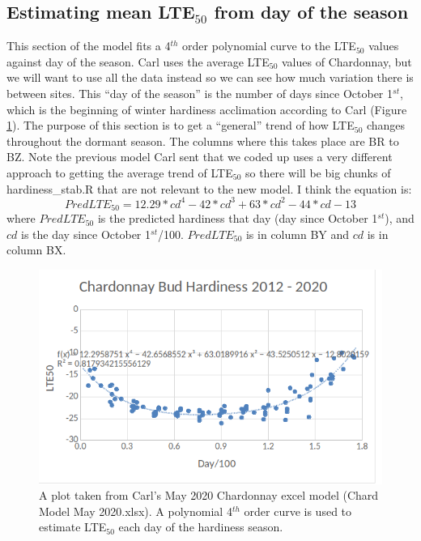 \documentclass[11pt,letter]{article}
\begin{document}
\subsection{Estimating mean LTE$_{50}$ from day of the season}
This section of the model fits a 4$^{th}$ order polynomial curve to the LTE$_{50}$ values against day of the season. Carl uses the average LTE$_{50}$ values of Chardonnay, but we will want to use all the data instead so we can see how much variation there is between sites. This ``day of the season'' is the number of days since October 1$^{st}$, which is the beginning of winter hardiness acclimation according to Carl (Figure \ref{fig:LTEperDay}). The purpose of this section is to get a ``general'' trend of how LTE$_{50}$ changes throughout the dormant season. The columns where this takes place are BR to BZ. Note the previous model Carl sent that we coded up uses a very different approach to getting the average trend of LTE$_{50}$ so there will be big chunks of hardiness\_stab.R that are not relevant to the new model. I think the equation is:
\begin{equation*}
PredLTE_{50} = 12.29*cd^{4} - 42*cd^{3} + 63*cd^{2} - 44*cd - 13
\end{equation*}
where $PredLTE_{50}$ is the predicted hardiness that day (day since October 1$^{st}$), and $cd$ is the day since October 1$^{st}$/100. $PredLTE_{50}$  is in column BY and $cd$ is in column BX. \\
  
\begin{figure}[H]
  \includegraphics[width=\linewidth]{FiguredLTEday.png}
  \caption{A plot taken from Carl's May 2020 Chardonnay excel model (Chard Model May 2020.xlsx). A polynomial 4$^{th}$ order curve is used to estimate LTE$_{50}$ each day of the hardiness season.}
  \label{fig:LTEperDay}
\end{figure}
\end{document}

